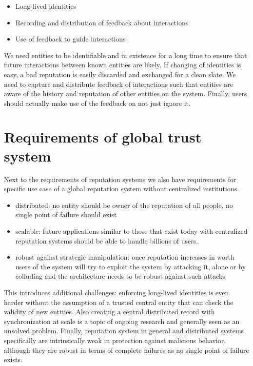 \begin{itemize}
    \item Long-lived identities
    \item Recording and distribution of feedback about interactions
    \item Use of feedback to guide interactions
\end{itemize}

We need entities to be identifiable and in existence for a long time to ensure that future interactions
between known entities are likely. If changing of identities is easy, a bad reputation is easily 
discarded and exchanged for a clean slate. We need to capture and distribute feedback of interactions
such that entities are aware of the history and reputation of other entities on the system. Finally,
users should actually make use of the feedback on not just ignore it.

\section{Requirements of global trust system}
Next to the requirements of reputation systems we also have requirements for specific use case of a
global reputation system without centralized institutions.


\begin{itemize}
    \item distributed: no entity should be owner of the reputation of all people, no single point of
    failure should exist
    \item scalable: future applications similar to those that exist today with centralized reputation
    systems should be able to handle billions of users.
    \item robust against strategic manipulation: once reputation increases in worth users of the 
    system will try to exploit the system by attacking it, alone or by colluding and the
    architecture needs to be robust against such attacks
\end{itemize}
  
This introduces additional challenges: enforcing long-lived identities is even harder without the 
assumption of a trusted central entity that can check the validity of new entities. Also creating
a central distributed record with synchronization at scale is a topic of ongoing research and 
generally seen as an unsolved problem. Finally, reputation system in general and distributed systems
specifically are intrinsically weak in protection against malicious behavior, although they are 
robust in terms of complete failures as no single point of failure exists.

